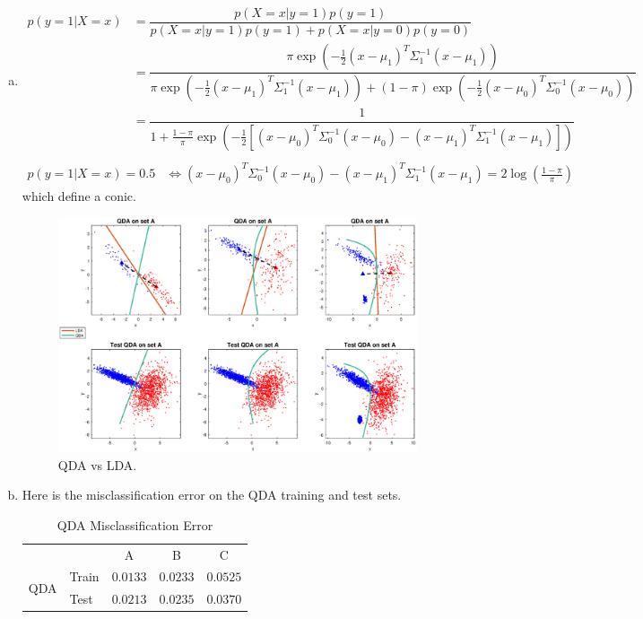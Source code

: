 \documentclass[a4paper,10pt]{article}
\theoremstyle{exostyle}
\begin{document}
\begin{enumerate}[(a)]
\item
\begin{align*}
p(y=1|X=x) & = \dfrac{p(X=x|y=1) p(y=1)}{p(X=x|y=1) p(y=1) + p(X=x|y=0) p(y=0)} \\
				& = \dfrac{\pi \exp\left(-\frac{1}{2} (x-\mu_1)^T \Sigma^{-1}_1 (x-\mu_1) \right)}{ \pi \exp\left(-\frac{1}{2} (x-\mu_1)^T \Sigma^{-1}_1 (x-\mu_1)\right) + (1-\pi) \exp\left(-\frac{1}{2} (x-\mu_0)^T \Sigma^{-1}_0 (x-\mu_0)\right)} \\
				& = \dfrac{1}{ 1 + \frac{1-\pi}{\pi} \exp\left( - \frac{1}{2} [  (x-\mu_0)^T \Sigma^{-1}_0 (x-\mu_0)-(x-\mu_1)^T \Sigma^{-1}_1 (x-\mu_1) ] \right)} \\
\end{align*}
\begin{align*}
p(y=1|X=x) = 0.5 & \Leftrightarrow   (x-\mu_0)^T \Sigma^{-1}_0 (x-\mu_0)-(x-\mu_1)^T \Sigma^{-1}_1 (x-\mu_1)  = 2  \log(\frac{1-\pi}{\pi})
\end{align*}
which define a conic.
\begin{figure}[!h]
\includegraphics[width=\textwidth]{classification_data_HWK1/classification_data_HWK1/QDA.eps} 
\caption{QDA vs LDA.}
\end{figure}
\item Here is the misclassification error on the QDA training and test sets. 
\begin{table}[!h]
\centering
\caption{QDA Misclassification Error}
\begin{tabular}{clccc}
\multicolumn{2}{l}{}         & A & B & C \\
\multirow{2}{*}{QDA} & Train & $0.0133$  & $0.0233$  &  $0.0525$ \\
                     & Test  &  $0.0213$ &  $0.0235$ &  $0.0370$
\end{tabular}
\end{table}


\end{enumerate}
\end{document}
